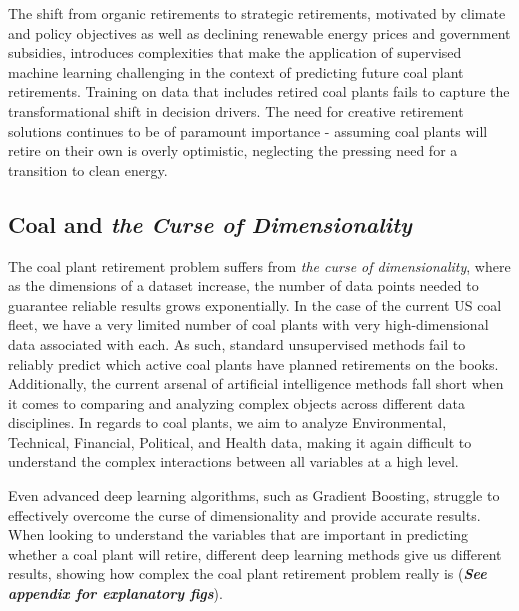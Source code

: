 The shift from organic retirements to strategic retirements, motivated by climate and policy objectives as well as declining renewable
energy prices and government subsidies, introduces complexities 
that make the application of supervised machine learning challenging in the context of predicting future coal plant retirements. 
Training on data that includes retired coal plants fails to capture the transformational shift in decision drivers. The need for 
creative retirement solutions continues to be of paramount importance - assuming coal plants will retire on their own is overly 
optimistic, neglecting the pressing need for a transition to clean energy.


\subsection{Coal and \textit{the Curse of Dimensionality}}

The coal plant retirement problem suffers from \textit{the curse of dimensionality}, where as the dimensions of a dataset 
increase, the number of data points needed to guarantee reliable results grows exponentially. In the case of the current US coal 
fleet, we have a very limited number of coal plants with very high-dimensional data associated with each. As such, standard 
unsupervised methods fail to reliably predict which active coal plants have planned retirements on the books. Additionally, the 
current arsenal of artificial intelligence methods fall short when it comes to comparing and analyzing complex objects across different 
data disciplines. In regards to coal plants, we aim to analyze Environmental, Technical, Financial, Political, and Health data, making 
it again difficult to understand the complex interactions between all variables at a high level. 

Even advanced deep learning algorithms, 
such as Gradient Boosting, struggle to effectively overcome the curse of dimensionality and provide accurate results. When looking to 
understand the variables that are important in predicting whether a coal plant will retire, different deep learning methods give us 
different results, showing how complex the coal plant retirement problem really is (\textit{\textbf{See appendix for explanatory figs}}).


